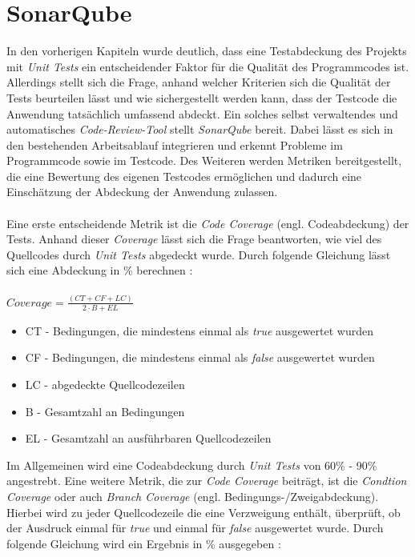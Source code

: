 \section{SonarQube}
In den vorherigen Kapiteln wurde deutlich, dass eine Testabdeckung des Projekts mit \textit{Unit Tests} ein entscheidender Faktor für die Qualität des Programmcodes ist. Allerdings stellt sich die Frage, anhand welcher Kriterien sich die Qualität der Tests beurteilen lässt und wie sichergestellt werden kann, dass der Testcode die Anwendung tatsächlich umfassend abdeckt. Ein solches selbst verwaltendes und automatisches \textit{Code-Review-Tool} stellt \textit{SonarQube} bereit. Dabei lässt es sich in den bestehenden Arbeitsablauf integrieren und erkennt Probleme im Programmcode sowie im Testcode. \cite*{SonarQube10} Des Weiteren werden Metriken bereitgestellt, die eine Bewertung des eigenen Testcodes ermöglichen und dadurch eine Einschätzung der Abdeckung der Anwendung zulassen.\\\\
Eine erste entscheidende Metrik ist die \textit{Code Coverage} (engl. Codeabdeckung) der Tests. Anhand dieser \textit{Coverage} lässt sich die Frage beantworten, wie viel des Quellcodes durch \textit{Unit Tests} abgedeckt wurde. Durch folgende Gleichung lässt sich eine Abdeckung in \% berechnen \cite*{MetricDefinition}:\\\\
$Coverage = \frac{(CT + CF + LC)}{2 \cdot B + EL}$
\begin{itemize}
    \setlength{\parskip}{1pt}
    \item CT - Bedingungen, die mindestens einmal als \textit{true} ausgewertet wurden
    \item CF - Bedingungen, die mindestens einmal als \textit{false} ausgewertet wurden
    \item LC - abgedeckte Quellcodezeilen
    \item B - Gesamtzahl an Bedingungen
    \item EL - Gesamtzahl an ausführbaren Quellcodezeilen
\end{itemize}
Im Allgemeinen wird eine Codeabdeckung durch \textit{Unit Tests} von 60\% - 90\% angestrebt. \cite*{WhatReasonableCode}
Eine weitere Metrik, die zur \textit{Code Coverage} beiträgt, ist die \textit{Condtion Coverage} oder auch \textit{Branch Coverage} (engl. Bedingungs-/Zweigabdeckung). Hierbei wird zu jeder Quellcodezeile die eine Verzweigung enthält, überprüft, ob der Ausdruck einmal für \textit{true} und einmal für \textit{false} ausgewertet wurde. Durch folgende Gleichung wird ein Ergebnis in \% ausgegeben \cite*{MetricDefinition}:\\\\
